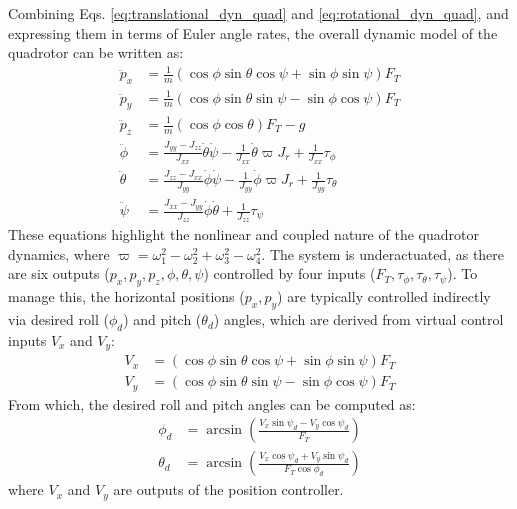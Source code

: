 Combining Eqs. \eqref{eq:translational_dyn_quad} and \eqref{eq:rotational_dyn_quad}, and expressing them in terms of Euler angle rates, the overall dynamic model of the quadrotor can be written as:
\begin{align}
\label{dynamic_eq}
\ddot{p}_x &= \frac{1}{m} (\cos\phi \sin\theta \cos\psi + \sin\phi \sin\psi) F_T \\
\ddot{p}_y &= \frac{1}{m} (\cos\phi \sin\theta \sin\psi - \sin\phi \cos\psi) F_T \\
\ddot{p}_z &= \frac{1}{m} (\cos\phi \cos\theta) F_T - g \\
\ddot{\phi} &= \frac{J_{yy}-J_{zz}}{J_{xx}} \dot{\theta}\dot{\psi} - \frac{1}{J_{xx}} \dot{\theta} \varpi J_r + \frac{1}{J_{xx}} \tau_{\phi} \\
\ddot{\theta} &= \frac{J_{zz}-J_{xx}}{J_{yy}} \dot{\phi}\dot{\psi} - \frac{1}{J_{yy}} \dot{\phi} \varpi J_r + \frac{1}{J_{yy}} \tau_{\theta} \\
\ddot{\psi} &= \frac{J_{xx}-J_{yy}}{J_{zz}} \dot{\phi}\dot{\theta} + \frac{1}{J_{zz}} \tau_{\psi}
\end{align}
These equations highlight the nonlinear and coupled nature of the quadrotor dynamics, where $\varpi = \omega_{1}^2 - \omega_{2}^2 + \omega_{3}^2 - \omega_{4}^2$. The system is underactuated, as there are six outputs ($p_x, p_y, p_z, \phi, \theta, \psi$) controlled by four inputs ($F_T, \tau_{\phi}, \tau_{\theta}, \tau_{\psi}$). To manage this, the horizontal positions ($p_x, p_y$) are typically controlled indirectly via desired roll ($\phi_d$) and pitch ($\theta_d$) angles, which are derived from virtual control inputs $V_x$ and $V_y$:
\begin{align}
\label{eq:virtual_inputs_quad}
V_x &= (\cos\phi \sin\theta \cos\psi + \sin\phi \sin\psi)F_T \\
V_y &= (\cos\phi \sin\theta \sin\psi - \sin\phi \cos\psi)F_T
\end{align}
From which, the desired roll and pitch angles can be computed as:
\begin{align}
\label{eq:desired_roll_pitch_quad}
\phi_d &= \arcsin\left(\frac{V_x \sin\psi_d - V_y \cos\psi_d}{F_T}\right) \\
\theta_d &= \arcsin\left(\frac{V_x \cos\psi_d + V_y \sin\psi_d}{F_T \cos\phi_d}\right)
\end{align}
where $V_x$ and $V_y$ are outputs of the position controller.

